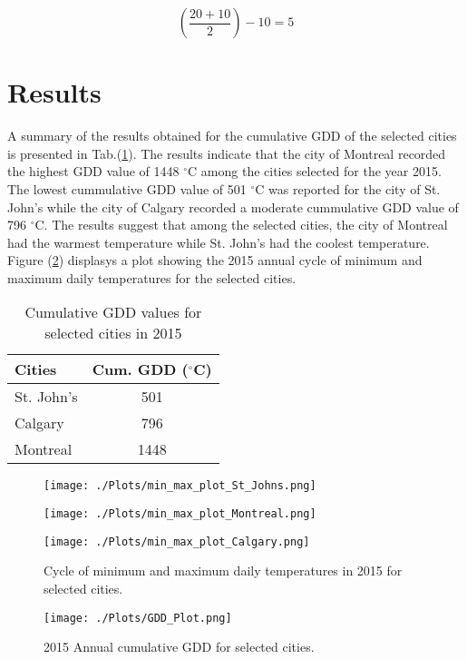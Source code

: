 \documentclass{article}
\begin{document}
\[ \left(\frac {20+10}{2}\right)-10=5 \] \par

\newpage
\section{ \bf Results}
A summary of the results obtained for the cumulative GDD of the selected cities is presented in Tab.(\ref{gdd-results}). The results indicate that the city of Montreal recorded the highest GDD value of 1448 $^{\circ}$C among the cities selected for the year 2015. The lowest cummulative GDD value of 501 $^{\circ}$C was reported for the city of St. John's while the city of Calgary recorded a moderate cummulative GDD value of 796 $^{\circ}$C. The results suggest that among the selected cities, the city of Montreal had the warmest temperature while St. John's had the coolest temperature. Figure (\ref{gdd-cycle}) displasys a plot showing the 2015 annual cycle of minimum and maximum daily temperatures for the selected cities.


\begin{table}[h]
\caption{Cumulative GDD values for selected cities in 2015} 
\label{gdd-results}
\centering
\begin{tabular}{l c}
\hline
\textbf{Cities} & \textbf{Cum. GDD} \textbf($^{\circ}$C) \\
\hline
St. John's & 501 \\
Calgary & 796 \\
Montreal & 1448 \\
\hline
\end{tabular}
\end{table}


\begin{center}
\begin{figure}
\texttt{[image: ./Plots/min\_max\_plot\_St\_Johns.png]}

\texttt{[image: ./Plots/min\_max\_plot\_Montreal.png]}

\texttt{[image: ./Plots/min\_max\_plot\_Calgary.png]}

\caption{Cycle of minimum and maximum daily temperatures in 2015 for selected cities.}
\label{gdd-cycle}
\end{figure}
\end{center}


\begin{center}
\begin{figure}
\texttt{[image: ./Plots/GDD\_Plot.png]}
\caption{2015 Annual cumulative GDD for selected cities.}
\label{gdd-cycle}
\end{figure}
\end{center}
\end{document}
